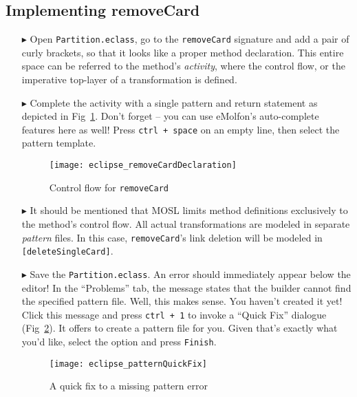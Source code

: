\newpage
\hypertarget{remCard tex}{}
\subsection{Implementing removeCard}
\texHeader

\begin{itemize}

\item[$\blacktriangleright$] Open \texttt{Partition.eclass}, go to the \texttt{removeCard} signature and add a pair of curly brackets, so that it looks like a
proper method declaration. This entire space can be referred to the method's \emph{activity}, where the control flow, or the imperative top-layer of a
transformation is defined.

\item[$\blacktriangleright$] Complete the activity with a single pattern and return statement as depicted in Fig~\ref{fig:remCardDec}. Don't forget -- you can
use eMolfon's auto-complete features here as well! Press \texttt{ctrl + space} on an empty line, then select the pattern template.

\begin{figure}[htp]
\begin{center}
  \texttt{[image: eclipse\_removeCardDeclaration]}
  \caption{Control flow for \texttt{removeCard} \update}
  \label{fig:remCardDec}
\end{center}
\end{figure}

\item[$\blacktriangleright$] It should be mentioned that MOSL limits method definitions exclusively to the method's control flow. All actual transformations are
modeled in separate \emph{pattern} files. In this case, \texttt{removeCard}'s link deletion will be modeled in \texttt{[deleteSingleCard]}.

\item[$\blacktriangleright$] Save the \texttt{Partition.eclass}. An error should immediately appear below the editor! In the ``Problems'' tab, the message
states that the builder cannot find the specified pattern file. Well, this makes sense. You haven't created it yet! Click this message and press \texttt{ctrl +
1} to invoke a ``Quick Fix'' dialogue (Fig~\ref{fig:quixFix}). It offers to create a pattern file for you. Given that's exactly what you'd like, select the option
and press \texttt{Finish}.

\begin{figure}[htp]
\begin{center}
  \texttt{[image: eclipse\_patternQuickFix]}
  \caption{A quick fix to a missing pattern error}
  \label{fig:quixFix}
\end{center}
\end{figure}


\end{itemize}
